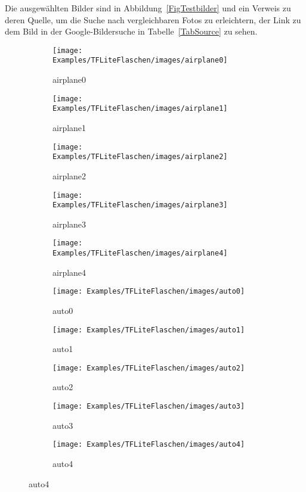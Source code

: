 Die ausgewählten Bilder sind in Abbildung~\ref{FigTestbilder} und ein Verweis zu deren Quelle, um die Suche nach vergleichbaren Fotos zu erleichtern, der Link zu dem Bild in der Google-Bildersuche in Tabelle~\ref{TabSource} zu sehen.


\begin{figure} [H]
\captionsetup[subfigure]{labelformat=empty}
    \begin{subfigure}{0.19\textwidth}
    \centering
	\texttt{[image: Examples/TFLiteFlaschen/images/airplane0]}
	\caption{airplane0}
	\end{subfigure}
	\begin{subfigure}{0.19\textwidth}
    \centering
	\texttt{[image: Examples/TFLiteFlaschen/images/airplane1]}
	\caption{airplane1}
	\end{subfigure}
	\begin{subfigure}{0.19\textwidth}
    \centering
	\texttt{[image: Examples/TFLiteFlaschen/images/airplane2]}
	\caption{airplane2}
	\end{subfigure}
	\begin{subfigure}{0.19\textwidth}
    \centering
	\texttt{[image: Examples/TFLiteFlaschen/images/airplane3]}
	\caption{airplane3}
	\end{subfigure}
	\begin{subfigure}{0.19\textwidth}
    \centering
	\texttt{[image: Examples/TFLiteFlaschen/images/airplane4]}
	\caption{airplane4}
	\end{subfigure}

    \begin{subfigure}{0.19\textwidth}
    \centering
	\texttt{[image: Examples/TFLiteFlaschen/images/auto0]}
	\caption{auto0}
	\end{subfigure}
	\begin{subfigure}{0.19\textwidth}
    \centering
	\texttt{[image: Examples/TFLiteFlaschen/images/auto1]}
	\caption{auto1}
	\end{subfigure}
	\begin{subfigure}{0.19\textwidth}
    \centering
	\texttt{[image: Examples/TFLiteFlaschen/images/auto2]}
	\caption{auto2}
	\end{subfigure}
	\begin{subfigure}{0.19\textwidth}
    \centering
	\texttt{[image: Examples/TFLiteFlaschen/images/auto3]}
	\caption{auto3}
	\end{subfigure}
	\begin{subfigure}{0.19\textwidth}
    \centering
	\texttt{[image: Examples/TFLiteFlaschen/images/auto4]}
	\caption{auto4}
	\end{subfigure}
	

\end{figure}

